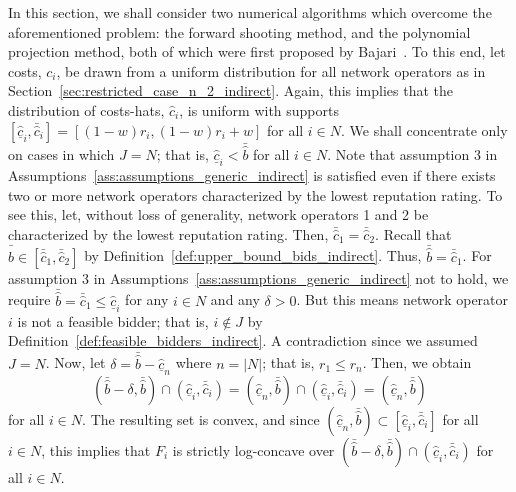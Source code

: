 In this section, we shall consider two numerical algorithms which overcome the aforementioned problem: the forward shooting method, and the polynomial projection method, both of which were first proposed by Bajari~\cite{Bajari2001a}. To this end, let costs, $c_i$, be drawn from a uniform distribution for all network operators as in Section~\ref{sec:restricted_case_n_2_indirect}. Again, this implies that the distribution of costs-hats, $\hat{c}_i$, is uniform with supports $[\underline{\hat{c}}_i, \bar{\hat{c}}_i] = [(1-w)r_i, (1-w)r_i + w]$ for all $i\in N$. We shall concentrate only on cases in which $J=N$; that is, $\underline{\hat{c}}_i < \bar{\hat{b}}$ for all $i\in N$. Note that assumption 3 in Assumptions~\ref{ass:assumptions_generic_indirect} is satisfied even if there exists two or more network operators characterized by the lowest reputation rating. To see this, let, without loss of generality, network operators 1 and 2 be characterized by the lowest reputation rating. Then, $\bar{\hat{c}}_1 = \bar{\hat{c}}_2$. Recall that $\bar{\hat{b}}\in [\bar{\hat{c}}_1, \bar{\hat{c}}_2]$ by Definition~\ref{def:upper_bound_bids_indirect}. Thus, $\bar{\hat{b}} = \bar{\hat{c}}_1$. For assumption 3 in Assumptions~\ref{ass:assumptions_generic_indirect} not to hold, we require $\bar{\hat{b}} = \bar{\hat{c}}_1 \leq \underline{\hat{c}}_i$ for any $i\in N$ and any $\delta>0$. But this means network operator $i$ is not a feasible bidder; that is, $i\not\in J$ by Definition~\ref{def:feasible_bidders_indirect}. A contradiction since we assumed $J = N$. Now, let $\delta = \bar{\hat{b}} - \underline{\hat{c}}_n$ where $n = |N|$; that is, $r_1\leq r_n$. Then, we obtain
\begin{equation*}
(\bar{\hat{b}}-\delta, \bar{\hat{b}})\cap (\underline{\hat{c}}_i, \bar{\hat{c}}_i) = (\underline{\hat{c}}_n, \bar{\hat{b}})\cap (\underline{\hat{c}}_i, \bar{\hat{c}}_i) = (\underline{\hat{c}}_n, \bar{\hat{b}})
\end{equation*}
for all $i\in N$. The resulting set is convex, and since $(\underline{\hat{c}}_n, \bar{\hat{b}})\subset [\underline{\hat{c}}_i, \bar{\hat{c}}_i]$ for all $i\in N$, this implies that $F_i$ is strictly log-concave over $(\bar{\hat{b}}-\delta, \bar{\hat{b}})\cap (\underline{\hat{c}}_i, \bar{\hat{c}}_i)$ for all $i\in N$.

